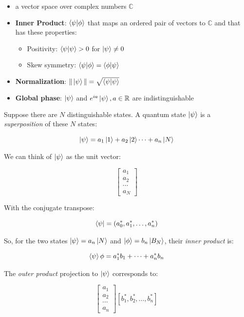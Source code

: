 \documentclass[11pt]{article}
\begin{document}
\begin{itemize}
	\item a vector space over complex numbers $\mathbb{C}$
	\item \textbf{Inner Product}: $\braket{\psi|\phi}$ that maps an ordered pair of vectors to $\mathbb{C}$ and that has these properties:
	      \begin{itemize}
		      \item Positivity: $\braket{\psi|\psi} > 0$ for $\ket{\psi} \ne 0$
		      \item Skew symmetry: $\braket{\psi|\phi} = \braket{\phi|\psi}$
	      \end{itemize}
	\item \textbf{Normalization}: $\|\ket{\psi}\| = \sqrt{\braket{\psi|\psi}}$
	\item \textbf{Global phase}: $\ket{\psi}$ and $e^{ia}\ket{\psi}, a \in \mathbb{R}$ are indistinguishable
\end{itemize}

Suppose there are $N$ distinguishable states. A quantum state $\ket{\psi}$ is a \textit{superposition} of these $N$ states:

\begin{equation*}
	\ket{\psi} = a_1 \ket{1} + a_2 \ket{2} \cdots + a_n \ket{N}
\end{equation*}

We can think of $\ket{\psi}$ as the unit vector:

\[
	\begin{bmatrix}
		a_1    \\
		a_2    \\
		\cdots \\
		a_N
	\end{bmatrix}
\]

With the conjugate transpose:

\[
	\bra{\psi} = (a_0^*, a_1^*, \ldots, a_n^*)
\]

So, for the two states $\ket{\psi} = a_n \ket{N}$ and $\ket{\phi} = b_n \ket{B_N}$, their \textit{inner product} is:

\begin{equation*}
	\braket{\psi}{\phi} = a_1^*b_1 + \cdots + a_n^*b_n
\end{equation*}

The \textit{outer product} projection to $\ket{\psi}$ corresponds to:

\[
	\begin{bmatrix}
		a_1    \\
		a_2    \\
		\cdots \\
		a_n
	\end{bmatrix}
	[b_1^*, b_2^*, \ldots, b_n^*]
\]
\end{document}
